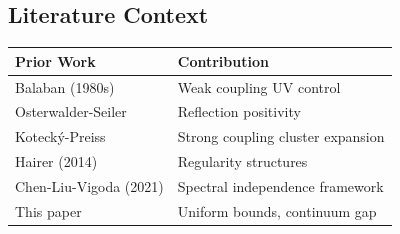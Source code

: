 \subsection{Literature Context}

\begin{center}
\begin{tabular}{|l|l|}
\hline
\textbf{Prior Work} & \textbf{Contribution} \\
\hline
Balaban (1980s) & Weak coupling UV control \\
Osterwalder-Seiler & Reflection positivity \\
Kotecký-Preiss & Strong coupling cluster expansion \\
Hairer (2014) & Regularity structures \\
Chen-Liu-Vigoda (2021) & Spectral independence framework \\
\hline
This paper & Uniform bounds, continuum gap \\
\hline
\end{tabular}
\end{center}








